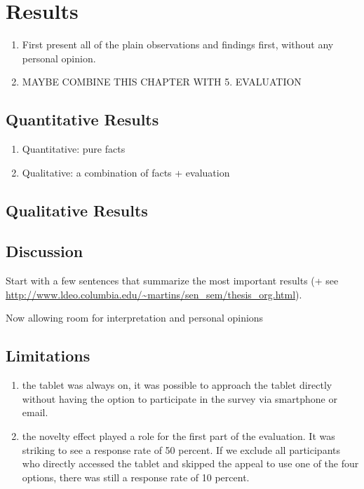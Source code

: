 \section{Results}


\begin{enumerate}
\item First present all of the plain observations and findings first, without any personal opinion.
\item MAYBE COMBINE THIS CHAPTER WITH 5. EVALUATION
\end{enumerate}


\subsection{Quantitative Results}

\begin{enumerate}
\item Quantitative: pure facts
\item Qualitative: a combination of facts + evaluation
\end{enumerate}


\subsection{Qualitative Results}

\subsection{Discussion}

Start with a few sentences that summarize the most important results (+ see \url{http://www.ldeo.columbia.edu/~martins/sen_sem/thesis_org.html}).

Now allowing room for interpretation and personal opinions

\subsection{Limitations}

\begin{enumerate}
\item the tablet was always on, it was possible to approach the tablet directly without having the option to participate in the survey via smartphone or email. 
\item the novelty effect played a role for the first part of the evaluation. It was striking to see a response rate of 50 percent. If we exclude all participants who directly accessed the tablet and skipped the appeal to use one of the four options, there was still a response rate of 10 percent.
\end{enumerate}